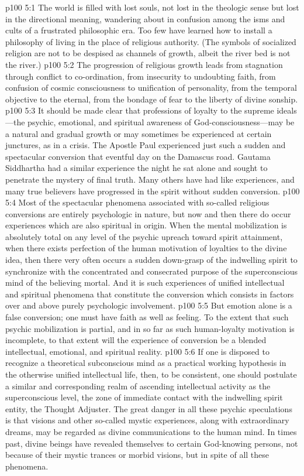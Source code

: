 \vs p100 5:1 The world is filled with lost souls, not lost in the theologic sense but lost in the directional meaning, wandering about in confusion among the isms and cults of a frustrated philosophic era. Too few have learned how to install a philosophy of living in the place of religious authority. (The symbols of socialized religion are not to be despised as channels of growth, albeit the river bed is not the river.)
\vs p100 5:2 The progression of religious growth leads from stagnation through conflict to co\hyp{}ordination, from insecurity to undoubting faith, from confusion of cosmic consciousness to unification of personality, from the temporal objective to the eternal, from the bondage of fear to the liberty of divine sonship.
\pc \vs p100 5:3 It should be made clear that professions of loyalty to the supreme ideals---the psychic, emotional, and spiritual awareness of God\hyp{}consciousness---may be a natural and gradual growth or may sometimes be experienced at certain junctures, as in a crisis. The Apostle Paul experienced just such a sudden and spectacular conversion that eventful day on the Damascus road. Gautama Siddhartha had a similar experience the night he sat alone and sought to penetrate the mystery of final truth. Many others have had like experiences, and many true believers have progressed in the spirit without sudden conversion.
\vs p100 5:4 Most of the spectacular phenomena associated with so\hyp{}called religious conversions are entirely psychologic in nature, but now and then there do occur experiences which are also spiritual in origin. When the mental mobilization is absolutely total on any level of the psychic upreach toward spirit attainment, when there exists perfection of the human motivation of loyalties to the divine idea, then there very often occurs a sudden down\hyp{}grasp of the indwelling spirit to synchronize with the concentrated and consecrated purpose of the superconscious mind of the believing mortal. And it is such experiences of unified intellectual and spiritual phenomena that constitute the conversion which consists in factors over and above purely psychologic involvement.
\vs p100 5:5 But emotion alone is a false conversion; one must have faith as well as feeling. To the extent that such psychic mobilization is partial, and in so far as such human\hyp{}loyalty motivation is incomplete, to that extent will the experience of conversion be a blended intellectual, emotional, and spiritual reality.
\pc \vs p100 5:6 If one is disposed to recognize a theoretical subconscious mind as a practical working hypothesis in the otherwise unified intellectual life, then, to be consistent, one should postulate a similar and corresponding realm of ascending intellectual activity as the superconscious level, the zone of immediate contact with the indwelling spirit entity, the Thought Adjuster. The great danger in all these psychic speculations is that visions and other so\hyp{}called mystic experiences, along with extraordinary dreams, may be regarded as divine communications to the human mind. In times past, divine beings have revealed themselves to certain God\hyp{}knowing persons, not because of their mystic trances or morbid visions, but in spite of all these phenomena.
